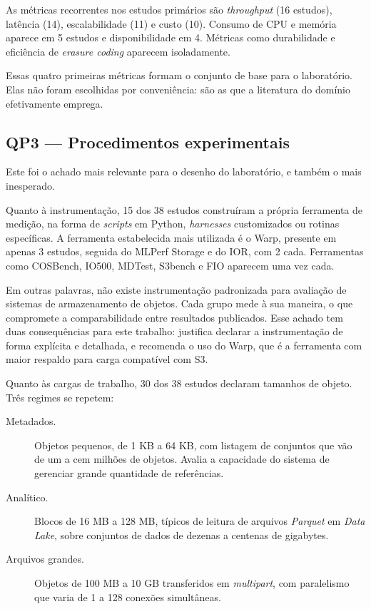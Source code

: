 As métricas recorrentes nos estudos primários são \textit{throughput} (16
estudos), latência (14), escalabilidade (11) e custo (10). Consumo de CPU e
memória aparece em 5 estudos e disponibilidade em 4. Métricas como durabilidade
e eficiência de \textit{erasure coding} aparecem isoladamente.

Essas quatro primeiras métricas formam o conjunto de base para o laboratório.
Elas não foram escolhidas por conveniência: são as que a literatura do domínio
efetivamente emprega.

\subsection{QP3 --- Procedimentos experimentais}

Este foi o achado mais relevante para o desenho do laboratório, e também o mais
inesperado.

Quanto à instrumentação, 15 dos 38 estudos construíram a própria ferramenta de
medição, na forma de \textit{scripts} em Python, \textit{harnesses} customizados
ou rotinas específicas. A ferramenta estabelecida mais utilizada é o Warp,
presente em apenas 3 estudos, seguida do MLPerf Storage e do IOR, com 2 cada.
Ferramentas como COSBench, IO500, MDTest, S3bench e FIO aparecem uma vez cada.

Em outras palavras, não existe instrumentação padronizada para avaliação de
sistemas de armazenamento de objetos. Cada grupo mede à sua maneira, o que
compromete a comparabilidade entre resultados publicados. Esse achado tem duas
consequências para este trabalho: justifica declarar a instrumentação de forma
explícita e detalhada, e recomenda o uso do Warp, que é a ferramenta com maior
respaldo para carga compatível com S3.

Quanto às cargas de trabalho, 30 dos 38 estudos declaram tamanhos de objeto.
Três regimes se repetem:

\begin{description}
    \item[Metadados.] Objetos pequenos, de 1 KB a 64 KB, com listagem de
          conjuntos que vão de um a cem milhões de objetos. Avalia a capacidade
          do sistema de gerenciar grande quantidade de referências.
    \item[Analítico.] Blocos de 16 MB a 128 MB, típicos de leitura de arquivos
          \textit{Parquet} em \textit{Data Lake}, sobre conjuntos de dados de
          dezenas a centenas de gigabytes.
    \item[Arquivos grandes.] Objetos de 100 MB a 10 GB transferidos em
          \textit{multipart}, com paralelismo que varia de 1 a 128 conexões
          simultâneas.
\end{description}

